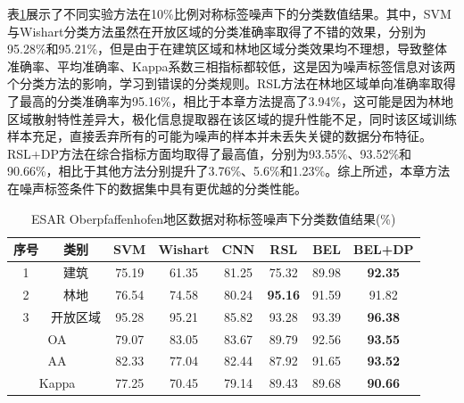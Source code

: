 表\ref{tab:ober_res_4}展示了不同实验方法在10\%比例对称标签噪声下的分类数值结果。其中，SVM与Wishart分类方法虽然在开放区域的分类准确率取得了不错的效果，分别为95.28\%和95.21\%，但是由于在建筑区域和林地区域分类效果均不理想，导致整体准确率、平均准确率、Kappa系数三相指标都较低，这是因为噪声标签信息对该两个分类方法的影响，学习到错误的分类规则。RSL方法在林地区域单向准确率取得了最高的分类准确率为95.16\%，相比于本章方法提高了3.94\%，这可能是因为林地区域散射特性差异大，极化信息提取器在该区域的提升性能不足，同时该区域训练样本充足，直接丢弃所有的可能为噪声的样本并未丢失关键的数据分布特征。RSL+DP方法在综合指标方面均取得了最高值，分别为93.55\%、93.52\%和90.66\%，相比于其他方法分别提升了3.76\%、5.6\%和1.23\%。综上所述，本章方法在噪声标签条件下的数据集中具有更优越的分类性能。

\begin{table}[ht!]
    \caption{ESAR Oberpfaffenhofen地区数据对称标签噪声下分类数值结果(\%)}
    \label{tab:ober_res_4}
    \begin{tabular}{cccccccc}
        \toprule[1.5bp]
        序号                        & 类别    & SVM   & Wishart & CNN   & RSL            & BEL            & BEL+DP         \\
        \midrule[0.75bp]
        1                         & 建筑    & 75.19 & 61.35   & 81.25 & 75.32          & 89.98          & \textbf{92.35} \\
        2                         & 林地    & 76.54 & 74.58   & 80.24 & \textbf{95.16} & 91.59          & 91.82          \\
        3                         & 开放区域  & 95.28 & 95.21   & 85.82 & 93.28          & 93.39          & \textbf{96.38} \\
        \midrule[0.75bp]
        \multicolumn{2}{c}{OA}    & 79.07 & 83.05 & 83.67   & 89.79 & 92.56          & \textbf{93.55}                  \\
        \multicolumn{2}{c}{AA}    & 82.33 & 77.04 & 82.44   & 87.92 & 91.65          & \textbf{93.52}                  \\
        \multicolumn{2}{c}{Kappa} & 77.25 & 70.45 & 79.14   & 89.43 & 89.68          & \textbf{90.66}                  \\
        \bottomrule[0.75bp]
    \end{tabular}
\end{table}

